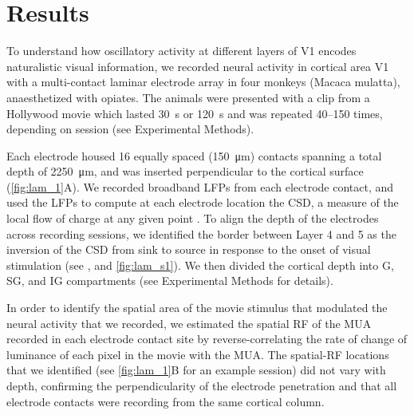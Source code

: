 \section{Results}

To understand how oscillatory activity at different layers of \acf{V1} encodes naturalistic visual information, we recorded neural activity in cortical area \acs{V1} with a multi-contact laminar electrode array in four monkeys (Macaca mulatta), anaesthetized with opiates.
The animals were presented with a clip from a Hollywood movie which lasted \SI{30}{\second} or \SI{120}{\second} and was repeated \numrange{40}{150} times, depending on session (see Experimental Methods).

Each electrode housed \num{16} equally spaced (\SI{150}{\micro\metre}) contacts spanning a total depth of \SI{2250}{\micro\metre}, and was inserted perpendicular to the cortical surface (\autoref{fig:lam_1}A).
We recorded broadband \acp{LFP} from each electrode contact, and used the \acp{LFP} to compute at each electrode location the \ac{CSD}, a measure of the local flow of charge at any given point \citep{Einevoll2013}.
To align the depth of the electrodes across recording sessions, we identified the border between Layer 4 and 5 as the inversion of the \ac{CSD} from sink to source in response to the onset of visual stimulation (see \citealp{Schroeder1991}, and \autoref{fig:lam_s1}).
We then divided the cortical depth into \acf{G}, \acf{SG}, and \acf{IG} compartments (see Experimental Methods for details).

In order to identify the spatial area of the movie stimulus that modulated the neural activity that we recorded, we estimated the spatial \ac{RF} of the \ac{MUA} recorded in each electrode contact site by reverse-correlating the rate of change of luminance of each pixel in the movie with the \ac{MUA}.
The spatial-\ac{RF} locations that we identified (see \autoref{fig:lam_1}B for an example session) did not vary with depth, confirming the perpendicularity of the electrode penetration and that all electrode contacts were recording from the same cortical column.


